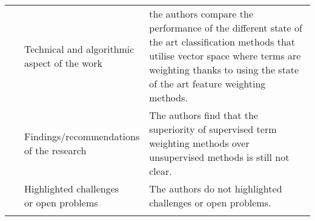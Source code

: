 \begin{landscape}
\begin{longtable}{lp{}p{}}
	\multirow{3}[0]{*}{~\citep{Mazyad2017}} & 
    \specialcell{Technical and algorithmic \\ aspect of the work} &
    the authors compare the performance of the different state of the art classification methods that utilise vector space where terms are weighting thanks to using the state of the art feature weighting methods.  
    \\ & 
    \specialcell{Findings/recommendations \\ of the research} & 
    The authors find that the superiority of supervised term weighting methods over unsupervised methods is still not clear. 
    \\ & 
    \specialcell{Highlighted challenges \\ or open problems} & 
    The authors do not highlighted challenges or open problems.
	\\
	
    \hline
     \label{tab:ebm}
    \end{longtable}%
\end{landscape}